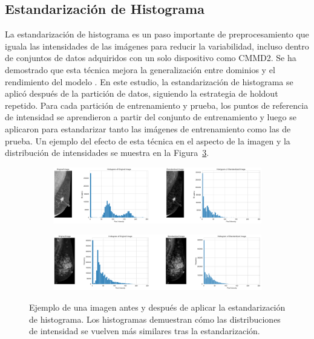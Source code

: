 \documentclass[a4paper,10pt]{book}
\begin{document}
\subsection{Estandarización de Histograma}

La estandarización de histograma es un paso importante de preprocesamiento que iguala las intensidades de las imágenes para reducir la variabilidad, incluso dentro de conjuntos de datos adquiridos con un solo dispositivo como CMMD2. Se ha demostrado que esta técnica mejora la generalización entre dominios y el rendimiento del modelo \cite{garruchoDomainGeneralizationDeep2022}. En este estudio, la estandarización de histograma se aplicó después de la partición de datos, siguiendo la estrategia de holdout repetido. Para cada partición de entrenamiento y prueba, los puntos de referencia de intensidad se aprendieron a partir del conjunto de entrenamiento y luego se aplicaron para estandarizar tanto las imágenes de entrenamiento como las de prueba. Un ejemplo del efecto de esta técnica en el aspecto de la imagen y la distribución de intensidades se muestra en la Figura~\ref{fig:standardized_examples}.


\begin{figure}[h!]
    \centering
    \begin{subfigure}[t]{1.0\textwidth}
        \centering
        \includegraphics[width=\textwidth]{reports//assets/standarized1.png}
        \label{fig:standarized_1}
    \end{subfigure}
    \begin{subfigure}[t]{1.0\textwidth}
        \centering
        \includegraphics[width=\textwidth]{reports//assets/standarized2.png}
        \label{fig:standardized_2}
    \end{subfigure}
    \caption[Resultado de la estandarización de histograma]{Ejemplo de una imagen antes y después de aplicar la estandarización de histograma. Los histogramas demuestran cómo las distribuciones de intensidad se vuelven más similares tras la estandarización.}
    \label{fig:standardized_examples}
\end{figure}
\end{document}
